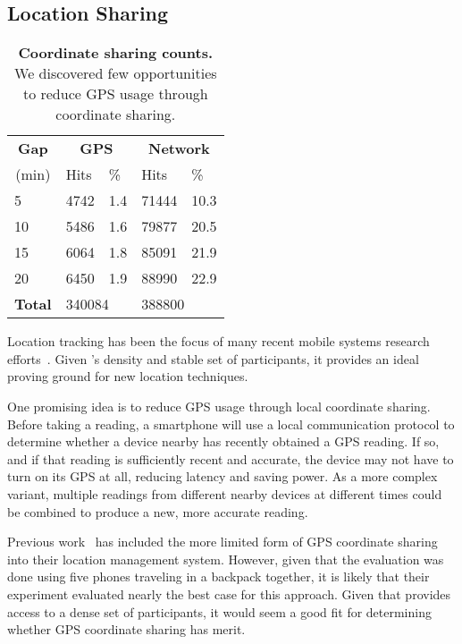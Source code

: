 \subsection{Location Sharing}
\label{subsec-locationsharing}

\begin{table}[t]
\begin{tabularx}{\columnwidth}{XXXXX}
\multicolumn{1}{c}{\normalsize{\textbf{Gap}}} &
\multicolumn{2}{c}{\normalsize{\textbf{GPS}}} &
\multicolumn{2}{c}{\normalsize{\textbf{Network}}} \\
\multicolumn{1}{c}{(min)} &
\multicolumn{1}{l}{Hits} &
\multicolumn{1}{l}{\%} &
\multicolumn{1}{l}{Hits} &
\multicolumn{1}{l}{\%} \\
\toprule
5 & \num{4742} & 1.4 & \num{71444} & 10.3 \\
10 & \num{5486} & 1.6 & \num{79877} & 20.5 \\
15 & \num{6064} & 1.8 & \num{85091} & 21.9 \\
20 & \num{6450} & 1.9 & \num{88990} & 22.9 \\
\midrule
\textbf{Total} & \multicolumn{2}{l}{\num{340084}} & \multicolumn{2}{l}{\num{388800}} \\
\end{tabularx}
\caption{\textbf{Coordinate sharing counts.} We discovered few opportunities
to reduce GPS usage through coordinate sharing.}
\label{table-locationsharing}
\end{table}

Location tracking has been the focus of many recent mobile systems research
efforts~\cite{kim:sensys:2010, paek:mobisys:2010, kjaergaard:mobisys:2011}.
Given \PhoneLab{}'s density and stable set of participants, it provides an ideal
proving ground for new location techniques.

One promising idea is to reduce GPS usage through local coordinate sharing.
Before taking a reading, a smartphone will use a local communication protocol
to determine whether a device nearby has recently obtained a GPS reading. If
so, and if that reading is sufficiently recent and accurate, the device may
not have to turn on its GPS at all, reducing latency and saving power. As a
more complex variant, multiple readings from different nearby devices at
different times could be combined to produce a new, more accurate reading.

Previous work~\cite{paek:mobisys:2010} has included the more limited form of GPS
coordinate sharing into their location management system. However, given that
the evaluation was done using five phones traveling in a backpack together,
it is likely that their experiment evaluated nearly the best case for this
approach. Given that \PhoneLab{} provides access to a dense set of
participants, it would seem a good fit for determining whether GPS coordinate
sharing has merit.

